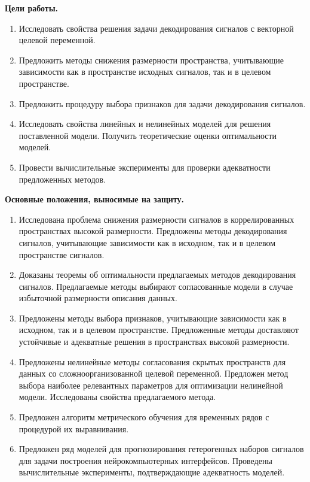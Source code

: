 \documentclass[11pt, a5paper]{dissert}
\begin{document}
\vspace{0.5cm}
\textbf{Цели работы.}
\begin{enumerate}
	\item Исследовать свойства решения задачи декодирования сигналов с векторной целевой переменной.
	\item Предложить методы снижения размерности пространства, учитывающие зависимости как в пространстве исходных сигналов, так и в целевом пространстве.
	\item Предложить процедуру выбора признаков для задачи декодирования сигналов.
	\item Исследовать свойства линейных и нелинейных моделей для решения поставленной модели. Получить теоретические оценки оптимальности моделей.
	\item Провести вычислительные эксперименты для проверки адекватности предложенных методов.
\end{enumerate}


\vspace{0.5cm}
\textbf{Основные положения, выносимые на защиту.}
\begin{enumerate}
	\item Исследована проблема снижения размерности сигналов в коррелированных пространствах высокой размерности. Предложены методы декодирования сигналов, учитывающие зависимости как в исходном, так и в целевом пространстве сигналов.
	\item Доказаны теоремы об оптимальности предлагаемых методов декодирования сигналов. Предлагаемые методы выбирают согласованные модели в случае избыточной размерности описания данных.
	\item Предложены методы выбора признаков, учитывающие зависимости как в исходном, так и в целевом пространстве. Предложенные методы доставляют устойчивые и адекватные решения в пространствах высокой размерности. 
	\item Предложены нелинейные методы согласования скрытых пространств для данных со сложноорганизованной целевой переменной. Предложен метод выбора наиболее релевантных параметров для оптимизации нелинейной модели. Исследованы свойства предлагаемого метода.
	\item Предложен алгоритм метрического обучения для временных рядов с процедурой их выравнивания.
	\item Предложен ряд моделей для прогнозирования гетерогенных наборов сигналов для задачи построения нейрокомпьютерных интерфейсов. Проведены вычислительные эксперименты, подтверждающие адекватность моделей.
\end{enumerate}
\end{document}
